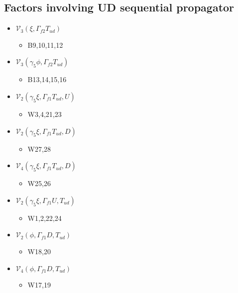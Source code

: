\documentclass{article}[12pt]
\begin{document}
\subsection{Factors involving UD sequential propagator}
\begin{itemize}
\item ${\mathcal V}_3\left(\xi, \Gamma_{f2} T_{ud}\right)$
\begin{itemize}
\item B9,10,11,12
\end{itemize}
\item ${\mathcal V}_3\left(\gamma_5\phi, \Gamma_{f2} T_{ud}\right)$
\begin{itemize}
\item B13,14,15,16
\end{itemize}
\item ${\mathcal V}_2\left(\gamma_5\xi, \Gamma_{f1} T_{ud}, U\right)$
\begin{itemize}
\item W3,4,21,23
\end{itemize}
\item ${\mathcal V}_2\left(\gamma_5\xi, \Gamma_{f1} T_{ud}, D\right)$
\begin{itemize}
\item W27,28
\end{itemize}
\item ${\mathcal V}_4\left(\gamma_5\xi, \Gamma_{f1} T_{ud}, D\right)$
\begin{itemize}
\item W25,26
\end{itemize}
\item ${\mathcal V}_2\left(\gamma_5\xi, \Gamma_{f1} U, T_{ud}\right)$
\begin{itemize}
\item W1,2,22,24
\end{itemize}
\item ${\mathcal V}_2\left(\phi, \Gamma_{f1} D, T_{ud} \right)$
\begin{itemize}
\item W18,20
\end{itemize}
\item ${\mathcal V}_4\left(\phi, \Gamma_{f1} D, T_{ud} \right)$
\begin{itemize}
\item W17,19
\end{itemize}
\end{itemize}
\end{document}
